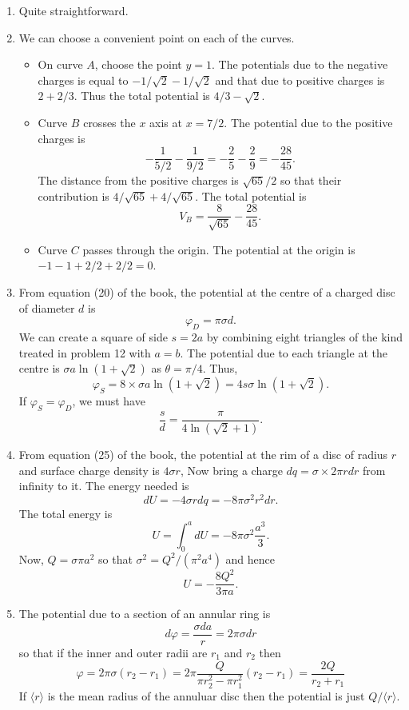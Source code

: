 \documentclass{article}
\begin{document}
\begin{enumerate}
\item Quite straightforward.

\item We can choose a convenient point on each of the curves. 
\begin{itemize}
\item On curve $A$, choose the point $y = 1$. The potentials due to the negative
charges is equal to $-1/\sqrt{2} - 1/\sqrt{2}$ and that due to positive charges
is $2 + 2/3$. Thus the total potential is $4/3 - \sqrt{2}$.
\item Curve $B$ crosses the $x$ axis at $x = 7/2$. The potential due to the
positive charges is
\[
-\frac{1}{5/2} - \frac{1}{9/2} = -\frac{2}{5} - \frac{2}{9} = -\frac{28}{45}.
\]
The distance from the positive charges is $\sqrt{65}/2$ so that their contribution
is $4/\sqrt{65} + 4/\sqrt{65}$. The total potential is
\[
V_B = \frac{8}{\sqrt{65}} - \frac{28}{45}.
\]
\item Curve $C$ passes through the origin. The potential at the origin is $-1
-1 + 2/2 + 2/2 = 0$. 
\end{itemize}

\item From equation (20) of the book, the potential at the centre of a charged
disc of diameter $d$ is
\[
\varphi_D = \pi\sigma d.
\]
We can create a square of side $s = 2a$ by combining eight triangles of the kind
treated in problem 12 with $a = b$. The potential due to each triangle at the 
centre is $\sigma a \ln(1 + \sqrt{2})$ as $\theta = \pi/4$. Thus,
\[
\varphi_S = 8 \times \sigma a \ln(1 + \sqrt{2}) = 4s\sigma\ln(1 + \sqrt{2}).
\]
If $\varphi_S = \varphi_D$, we must have
\[
\frac{s}{d} = \frac{\pi}{4\ln(\sqrt{2} + 1)}.
\]

\item From equation (25) of the book, the potential at the rim of a disc of radius
$r$ and surface charge density is $4\sigma r$, Now bring a charge $dq = \sigma 
\times 2\pi rdr$ from infinity to it. The energy needed is
\[
dU = -4\sigma r dq = -8\pi\sigma^2 r^2 dr.
\]
The total energy is
\[
U = \int_0^a dU = -8\pi\sigma^2\frac{a^3}{3}.
\]
Now, $Q = \sigma \pi a^2$ so that $\sigma^2 = Q^2/(\pi^2 a^4)$ and hence
\[
U = -\frac{8Q^2}{3\pi a}.
\]

\item The potential due to a section of an annular ring is
\[
d\varphi = \frac{\sigma da}{r} = 2\pi\sigma dr
\]
so that if the inner and outer radii are $r_1$ and $r_2$ then
\[
\varphi = 2\pi\sigma (r_2 - r_1) = 
2\pi\frac{Q}{\pi r_2^2 - \pi r_1^2}(r_2 - r_1)
= \frac{2Q}{r_2 + r_1}
\]
If $\langle r \rangle$ is the mean radius of the annuluar disc then the potential
is just $Q/\langle r \rangle$.


\end{enumerate}
\end{document}
